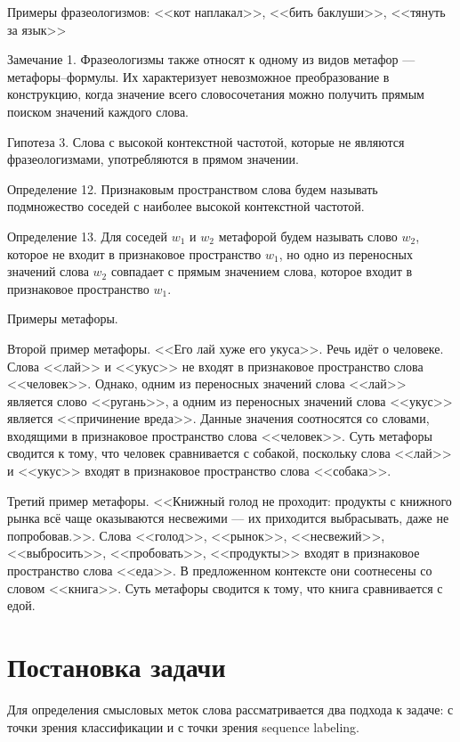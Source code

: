 \documentclass[12pt,twoside]{article}
\begin{document}
Примеры фразеологизмов: <<кот наплакал>>, <<бить баклуши>>, <<тянуть за язык>>

Замечание 1. Фразеологизмы также относят к одному из видов метафор --- метафоры--формулы. Их характеризует невозможное преобразование в конструкцию, когда значение всего словосочетания можно получить прямым поиском значений каждого слова. 

Гипотеза 3. Слова с высокой контекстной частотой, которые не являются фразеологизмами, употребляются в прямом значении.

Определение 12. 
Признаковым пространством слова будем называть подмножество соседей с наиболее высокой контекстной частотой.

Определение 13. Для соседей $w_1$ и $w_2$ метафорой будем называть слово $w_2$, которое не входит в признаковое пространство $w_1$, но одно из переносных значений слова $w_2$ совпадает с прямым значением слова, которое входит в признаковое пространство $w_1$.

Примеры метафоры. 


Второй пример метафоры. <<Его лай хуже его укуса>>. Речь идёт о человеке. Слова <<лай>> и <<укус>> не входят в признаковое пространство слова <<человек>>. Однако, одним из переносных значений слова <<лай>> является слово <<ругань>>, а одним из переносных значений слова  <<укус>> является <<причинение вреда>>. Данные значения соотносятся со словами, входящими в признаковое пространство слова <<человек>>. Суть метафоры сводится к тому, что человек сравнивается с собакой, поскольку слова <<лай>> и <<укус>> входят в признаковое пространство слова <<собака>>.   

Третий пример метафоры. <<Книжный голод не проходит: продукты с книжного рынка всё чаще оказываются несвежими --- их приходится выбрасывать, даже не попробовав.>>. Слова <<голод>>, <<рынок>>, <<несвежий>>, <<выбросить>>, <<пробовать>>, <<продукты>> входят в признаковое пространство слова <<еда>>. В предложенном контексте они соотнесены со словом <<книга>>. Суть метафоры сводится к тому, что книга сравнивается с едой.



\section{Постановка задачи}
Для определения смысловых меток слова рассматривается два подхода к задаче: с точки зрения классификации и с точки зрения sequence labeling.
\end{document}
